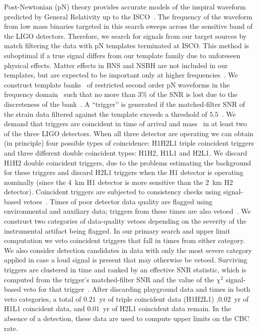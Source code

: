 Post-Newtonian (pN) theory provides accurate models of the inspiral waveform predicted by 
General Relativity up to the
\ac{ISCO}~\cite{Blanchet:1996pi,Droz:1999qx,Blanchet:2002av,%
Buonanno:2006ui,Boyle:2007ft,Hannam:2007ik,%
pan:024014,Boyle:2009dg}. The frequency of the waveform from low mass binaries 
targeted in this search sweeps across the sensitive band of the LIGO detectors.
Therefore, we search for signals from our target sources by match filtering 
the data with \ac{pN} templates terminated at \ac{ISCO}. This method is 
suboptimal if a true signal differs from our template family due to unforeseen
physical effects. Matter effects in BNS and NSBH are not included in our 
templates, but are expected to be important only at higher frequencies~\cite{Shibata:2009cn,Kiuchi:2009jt}. We construct template banks~\cite{hexabank} of 
restricted second order \ac{pN} waveforms in the frequency
domain~\cite{thorne.k:1987,SathyaDhurandhar:1991,Droz:1999qx} such that no
more than $3\%$ of the \ac{SNR} is lost due to the discreteness of the 
bank~\cite{Owen:1998dk}. A ``trigger'' is generated if the matched-filter 
\ac{SNR} of the strain data filtered against the template exceeds a
threshold of $5.5$~\cite{Allen:2005fk}.  We demand that triggers are coincident 
in time of arrival and mass~\cite{Robinson:2008} in at least two of the 
three \ac{LIGO} detectors. When all three detector are operating we can obtain 
(in principle) four possible types of coincidence: H1H2L1 triple coincident 
triggers and three different double coincident types: H1H2, H1L1 and H2L1. 
We discard H1H2 double coincident triggers, due to the problems estimating the 
background for these triggers and discard H2L1 triggers when the H1 detector is
operating nominally (since the 4~km H1 detector is more sensitive than the 2~km 
H2 detector).
%
Coincident triggers are subjected to consistency checks using signal-based
vetoes~\cite{LIGOS3S4Tuning,Allen:2004,Rodriguez:2007}. Times of poor detector
data quality are flagged using environmental and auxiliary data;
triggers from these times are also vetoed~\cite{Collaboration:2009tt}. We
construct two categories of data-quality vetoes depending on the severity of
the instrumental artifact being flagged. In our primary search and upper limit
computation we veto coincident triggers that fall in times from either
category. We also consider detection candidates in data with only the most
severe category applied in case a loud signal is present that may
otherwise be vetoed.   Surviving triggers are clustered in time and ranked by
an effective \ac{SNR} statistic, which is computed from the trigger's
matched-filter \ac{SNR} and the value of the $\chi^2$ signal-based veto for
that trigger~\cite{LIGOS3S4all}.  After discarding playground data and times
in both veto categories, a total of $0.21$~yr of triple coincident data (H1H2L1)
,$0.02$~yr of H1L1 coincident data, and $0.01$~yr of H2L1 coincident data
remain. In the absence of a detection, these data are used to compute upper
limits on the \ac{CBC} rate.

